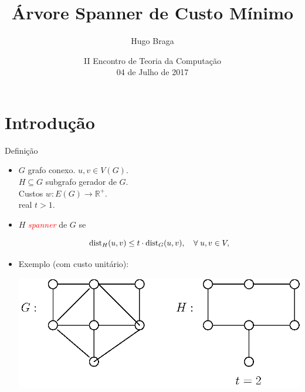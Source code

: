 \documentclass[dvipsnames]{beamer}
\title[Spanners]
{Árvore Spanner de Custo Mínimo}
\author[hugo]
{Hugo Braga}
\institute[USP]
{
 Instituto de Matem\'{a}tica e Estat\'{i}stica\\
 Universidade de S\~{a}o Paulo\\
}
\date[Short Occasion]
{II Encontro de Teoria da Computação \\ 04 de Julho de 2017  }
\newcommand{\dist}{{\rm dist}}
\newcommand{\R}{\mathbb{R}}
\begin{document}
\begin{frame}
 \titlepage
\end{frame}


\section{Introdução}

\begin{frame}{Definição}

\begin{itemize}
 \item $G$ grafo conexo. $u,v \in V(G)$.\\
   $H \subseteq G$ subgrafo gerador de $G$.\\
   Custos $w: E(G) \rightarrow \R^+$.\\
   real $t > 1$.
 \item $H$ \textcolor{red}{\emph{spanner}} de $G$ se 

\begin{equation}
  \dist_{H}(u,v) \le t \cdot \dist_{G}(u,v), \quad \forall\;u,v \in V,
  \label{eq:def_spanner}
\end{equation}



\item Exemplo (com custo unitário):

\begin{minipage}[t][.5\textheight][t]{\textwidth}
\centering
\includegraphics[scale=0.55]{figures/stretch_example_w_label.eps}
\end{minipage}

\end{itemize}

\end{frame}
\end{document}
